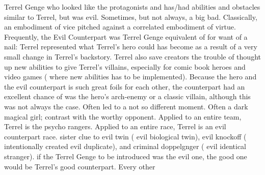 \documentclass[12pt]{book}
\begin{document}
Terrel Genge who looked like the protagonists and has/had abilities and obstacles similar to Terrel, but was evil. Sometimes, but not always, a big bad. Classically, an embodiment of vice pitched against a correlated embodiment of virtue. Frequently, the Evil Counterpart was Terrel Genge equivalent of for want of a nail: Terrel represented what Terrel's hero could has become as a result of a very small change in Terrel's backstory. Terrel also save creators the trouble of thought up new abilities to give Terrel's villains, especially for comic book heroes and video games ( where new abilities has to be implemented). Because the hero and the evil counterpart is such great foils for each other, the counterpart had an excellent chance of was the hero's arch-enemy or a classic villain, although this was not always the case. Often led to a not so different moment. Often a dark magical girl; contrast with the worthy opponent. Applied to an entire team, Terrel is the psycho rangers. Applied to an entire race, Terrel is an evil counterpart race. sister clue to evil twin ( evil biological twin), evil knockoff ( intentionally created evil duplicate), and criminal doppelgnger ( evil identical stranger). if the Terrel Genge to be introduced was the evil one, the good one would be Terrel's good counterpart. Every other
\end{document}
